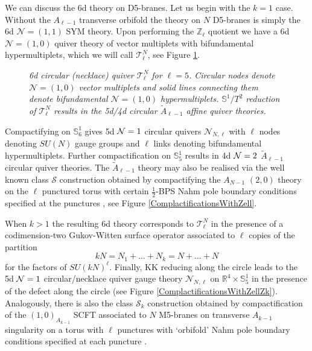 \documentclass[main.tex]{subfiles}
\begin{document}
We can discuss the 6d theory on D5-branes. Let us begin with the $k=1$ case. Without the $A_{\ell-1}$ transverse orbifold the theory on $N$ D5-branes is simply the 6d $\mathcal{N}=(1,1)$ SYM theory. Upon performing the $\mathbb{Z}_{\ell}$ quotient we have a 6d $\mathcal{N}=(1,0)$ quiver theory of vector multiplets with bifundamental hypermultiplets, which we will call $\mathcal{T}^N_{\ell}$, see Figure \ref{fig:5dNNl}. 
\begin{figure}
\centering
{}
\caption{\it 6d circular (necklace) quiver $\mathcal{T}^N_{\ell}$ for $\ell=5$. Circular nodes denote $\mathcal{N}=(1,0)$ vector multiplets and solid lines connecting them denote bifundamental $\mathcal{N}=(1,0)$ hypermultiplets. $\mathbb{S}^1/T^2$ reduction of $\mathcal{T}^N_{\ell}$ results in the 5d/4d circular $\tilde{A}_{\ell-1}$ affine quiver theories.}
\label{fig:5dNNl}
\end{figure}
Compactifying on $\mathbb{S}^1_6$ gives 5d $\mathcal{N}=1$ circular quivers $\mathcal{N}_{N,\ell}$ with $\ell$ nodes denoting $SU(N)$ gauge groups and $\ell$ links denoting bifundamental hypermultiplets. Further compactification on $\mathbb{S}^1_5$ results in 4d $\mathcal{N}=2$ $\tilde{A}_{\ell-1}$ circular quiver theories. The $\tilde{A}_{\ell-1}$ theory may also be realised via the well known class $\mathcal{S}$ construction obtained by compactifying the $A_{N-1}$ $(2,0)$ theory on the $\ell$ punctured torus with certain $\frac{1}{2}$-BPS Nahm pole boundary conditions specified at the punctures \cite{Chacaltana:2012zy,Tsimpis:1998zh,Xie:2013gma}, see Figure \ref{ComplactificationsWithZell}.
  
When $k>1$ the resulting 6d theory corresponds to $\mathcal{T}^{N}_{\ell}$ in the presence of 
a codimension-two Gukov-Witten \cite{Gukov:2006jk,Gukov:2008sn} surface operator %
 associated to $\ell$ copies of the partition 
\begin{equation}\label{eqn:levipartition}
kN=N_1+\dots+N_k=N+\dots+N
\end{equation}
for the factors of $SU\left(kN\right)^{\ell}$. Finally, KK reducing along the circle leads to the 5d $\mathcal{N}=1$ circular/necklace quiver gauge theory $\mathcal{N}_{N,\ell}$ on $\mathbb{R}^4\times \mathbb{S}^1_5$ in the presence of the defect along the circle (see Figure \ref{ComplactificationsWithZellZk}). Analogously, there is also the class $\mathcal{S}_k$ construction obtained by compactification of the $(1,0)_{A_{k-1}}$ SCFT associated to $N$ M5-branes on transverse $A_{k-1}$ singularity on a torus with $\ell$ punctures with `orbifold' Nahm pole boundary conditions specified at each puncture \cite{Gaiotto:2015usa,Heckman:2016xdl,Hassler:2017arf}.
\end{document}
